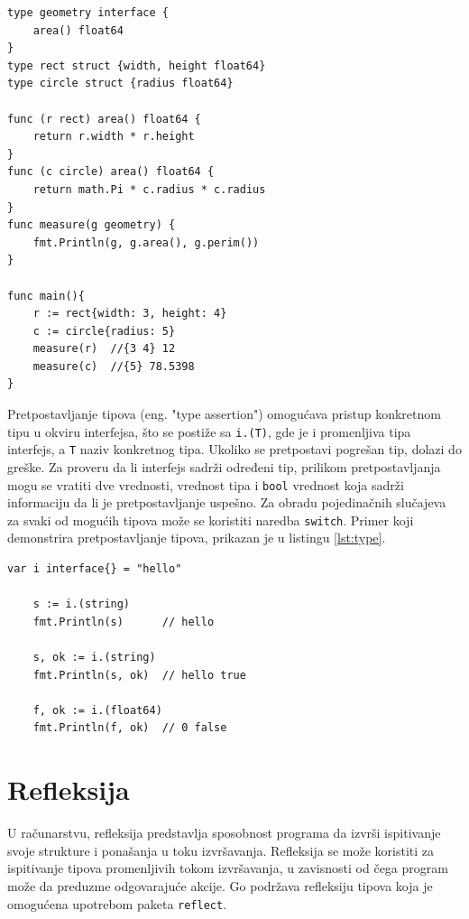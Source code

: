 \documentclass[12pt,oneside]{memoir}
\begin{document}
\begin{center}
\begin{lstlisting}[caption=Primer koji demonstrira rad sa interfejsima, label={lst:inter},  backgroundcolor=\color{background}]
type geometry interface { 
	area() float64 
}
type rect struct {width, height float64}
type circle struct {radius float64}

func (r rect) area() float64 {
	return r.width * r.height
}
func (c circle) area() float64 {
	return math.Pi * c.radius * c.radius
}
func measure(g geometry) {
	fmt.Println(g, g.area(), g.perim())
}

func main(){
	r := rect{width: 3, height: 4}	
	c := circle{radius: 5}			
	measure(r)	//{3 4} 12 
  	measure(c)	//{5} 78.5398 
}
\end{lstlisting}
\end{center}

Pretpostavljanje tipova (eng. "type assertion") omogućava pristup konkretnom tipu u okviru interfejsa, što se postiže sa \texttt{i.(T)}, gde je i promenljiva tipa interfejs, a \texttt{T} naziv konkretnog tipa. Ukoliko se pretpostavi pogrešan tip, dolazi do greške.  Za proveru da li interfejs sadrži određeni tip, prilikom pretpostavljanja mogu se vratiti dve vrednosti, vrednost tipa i \texttt{bool} vrednost koja sadrži informaciju da li je pretpostavljanje uspešno. Za obradu pojedinačnih slučajeva za svaki od mogućih tipova može se koristiti naredba \texttt{switch}.  Primer koji demonstrira pretpostavljanje tipova, prikazan je u listingu \ref{lst:type}.

\begin{center}
\begin{lstlisting}[caption=Primer koji demonstrira pretpostavljanje tipova kod interfejsa, label={lst:type},  backgroundcolor=\color{background}]
	var i interface{} = "hello"

	s := i.(string)
	fmt.Println(s) 		// hello

	s, ok := i.(string)
	fmt.Println(s, ok) 	// hello true

	f, ok := i.(float64)
	fmt.Println(f, ok) 	// 0 false
\end{lstlisting}
\end{center}


\section{Refleksija}

U računarstvu, refleksija predstavlja sposobnost programa da izvrši ispitivanje svoje strukture i ponašanja u toku izvršavanja. Refleksija se može koristiti za ispitivanje tipova promenljivih tokom izvršavanja, u zavisnosti od čega program može da preduzme odgovarajuće akcije. Go podržava refleksiju tipova koja je omogućena upotrebom paketa \texttt{reflect}.
\end{document}
